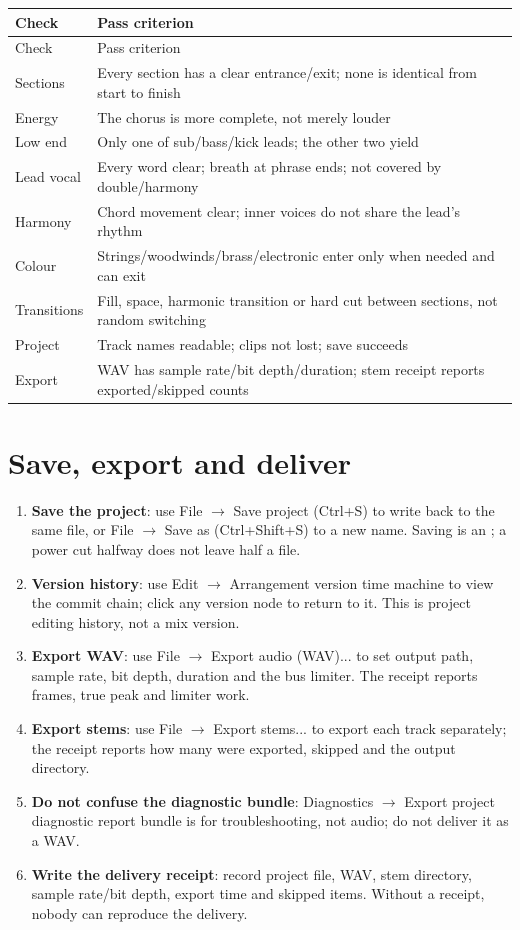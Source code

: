 \begin{longtable}{p{}p{}}
\toprule
Check & Pass criterion \\
\midrule
\endfirsthead
\toprule
Check & Pass criterion \\
\midrule
\endhead
Sections & Every section has a clear entrance/exit; none is identical from start to finish \\
Energy & The chorus is more complete, not merely louder \\
Low end & Only one of sub/bass/kick leads; the other two yield \\
Lead vocal & Every word clear; breath at phrase ends; not covered by double/harmony \\
Harmony & Chord movement clear; inner voices do not share the lead's rhythm \\
Colour & Strings/woodwinds/brass/electronic enter only when needed and can exit \\
Transitions & Fill, space, harmonic transition or hard cut between sections, not random switching \\
Project & Track names readable; clips not lost; save succeeds \\
Export & WAV has sample rate/bit depth/duration; stem receipt reports exported/skipped counts \\
\bottomrule
\end{longtable}

\section{Save, export and deliver}
\label{sec:walkthrough-delivery}

\begin{enumerate}
\item \textbf{Save the project}: use File $\rightarrow$ Save project (Ctrl+S) to write back to the same file, or File $\rightarrow$ Save as (Ctrl+Shift+S) to a new name. Saving is an ; a power cut halfway does not leave half a file.
\item \textbf{Version history}: use Edit $\rightarrow$ Arrangement version time machine to view the commit chain; click any version node to return to it. This is project editing history, not a mix version.
\item \textbf{Export WAV}: use File $\rightarrow$ Export audio (WAV)... to set output path, sample rate, bit depth, duration and the bus limiter. The receipt reports frames, true peak and limiter work.
\item \textbf{Export stems}: use File $\rightarrow$ Export stems... to export each track separately; the receipt reports how many were exported, skipped and the output directory.
\item \textbf{Do not confuse the diagnostic bundle}: Diagnostics $\rightarrow$ Export project diagnostic report bundle is for troubleshooting, not audio; do not deliver it as a WAV.
\item \textbf{Write the delivery receipt}: record project file, WAV, stem directory, sample rate/bit depth, export time and skipped items. Without a receipt, nobody can reproduce the delivery.
\end{enumerate}

